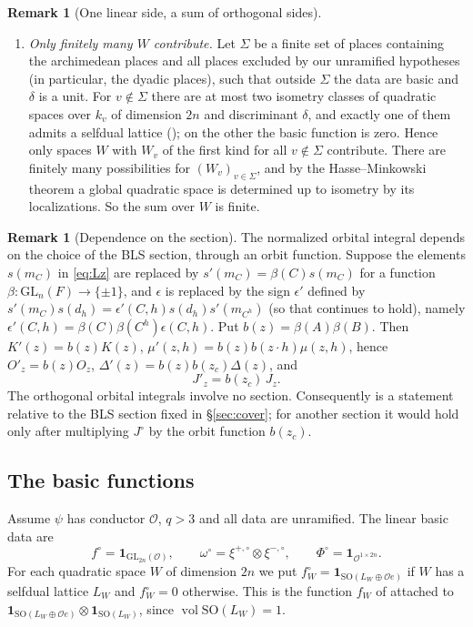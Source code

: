 \documentclass[11pt,oneside,notitlepage]{book}
\numberwithin{equation}{section}
\theoremstyle{plain}
\theoremstyle{definition}
\newtheorem{remark}[theorem]{Remark}
\newcommand{\cO}{\mathcal{O}}
\newcommand{\GL}{\mathrm{GL}}
\newcommand{\SO}{\mathrm{SO}}
\newcommand{\vol}{\operatorname{vol}}
\newcommand{\one}{\mathbf{1}}
\begin{document}
\begin{remark}[One linear side, a sum of orthogonal sides]
\begin{enumerate}[label=(\alph*)]
		\[I_W^{\SO,\rm reg}(f_W)=2I_W^{\rm reg}(f_W).\]
		\item \emph{Only finitely many $W$ contribute.} Let $\Sigma$ be a finite set of places containing the archimedean places and all places excluded by our unramified hypotheses (in particular, the dyadic places), such that outside $\Sigma$ the data are basic and $\delta$ is a unit. For $v\notin\Sigma$ there are at most two isometry classes of quadratic spaces over $k_v$ of dimension $2n$ and discriminant $\delta$, and exactly one of them admits a selfdual lattice (); on the other the basic function is zero. Hence only spaces $W$ with $W_v$ of the first kind for all $v\notin\Sigma$ contribute. There are finitely many possibilities for $(W_v)_{v\in\Sigma}$, and by the Hasse--Minkowski theorem a global quadratic space is determined up to isometry by its localizations. So the sum over $W$ is finite.
	\end{enumerate}
\end{remark}


\begin{remark}[Dependence on the section]\label{rem:section}
The normalized orbital integral depends on the choice of the BLS section, through an orbit function. Suppose the elements $s(m_C)$ in \eqref{eq:Lz} are replaced by $s'(m_C)=\beta(C)s(m_C)$ for a function $\beta:\GL_n(F)\to\{\pm1\}$, and $\epsilon$ is replaced by the sign $\epsilon'$ defined by $s'(m_C)s(d_h)=\epsilon'(C,h)s(d_h)s'(m_{C^h})$ (so that  continues to hold), namely $\epsilon'(C,h)=\beta(C)\beta(C^h)\epsilon(C,h)$. Put $b(z)=\beta(A)\beta(B)$. Then $K'(z)=b(z)K(z)$, $\mu'(z,h)=b(z)b(z\cdot h)\mu(z,h)$, hence $O'_z=b(z)O_z$, $\Delta'(z)=b(z)b(z_c)\Delta(z)$, and
\[J'_z=b(z_c)\,J_z .\]
The orthogonal orbital integrals involve no section. Consequently  is a statement relative to the BLS section fixed in \S\ref{sec:cover}; for another section it would hold only after multiplying $J^\circ$ by the orbit function $b(z_c)$.
\end{remark}

\subsection*{The basic functions}

Assume $\psi$ has conductor $\cO$, $q>3$ and all data are unramified. The linear basic data are
\[f^\circ=\one_{\GL_{2n}(\cO)},\qquad\omega^\circ=\xi^{+,\circ}\otimes\xi^{-,\circ},\qquad\Phi^\circ=\one_{\cO^{1\times2n}}.\]
For each quadratic space $W$ of dimension $2n$ we put $f^\circ_W=\one_{\SO(L_W\oplus\cO e)}$ if $W$ has a selfdual lattice $L_W$ and $f^\circ_W=0$ otherwise. This is the function $f_W$ of  attached to $\one_{\SO(L_W\oplus\cO e)}\otimes\one_{\SO(L_W)}$, since $\vol\SO(L_W)=1$.
\end{document}
